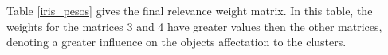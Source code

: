 \documentclass[10pt, conference, compsocconf]{IEEEtran}
\begin{document}
Table \ref{iris_pesos} gives the final relevance weight matrix. In this table, the weights for the matrices 3 and 4 have greater values then the other matrices, denoting a greater influence on the objects affectation to the clusters.
%
%
%
%
%
\end{document}
